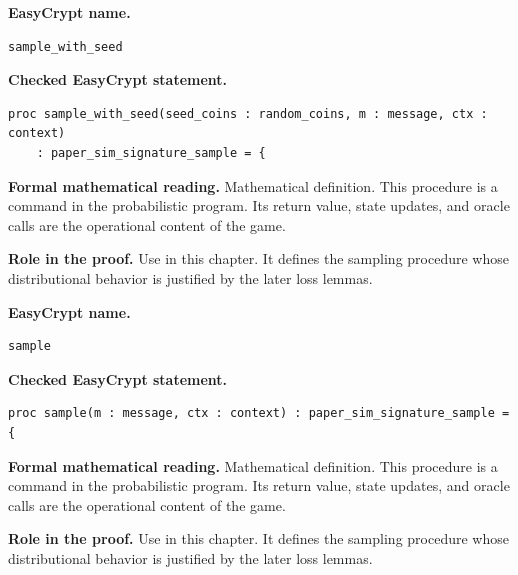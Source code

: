 \begin{formaldefinition}
\noindent\textbf{EasyCrypt name.}
\begin{lstlisting}[language=EasyCrypt,basicstyle=\ttfamily\scriptsize]
sample_with_seed
\end{lstlisting}
\noindent\textbf{Checked EasyCrypt statement.}
\begin{lstlisting}[language=EasyCrypt,basicstyle=\ttfamily\scriptsize]
proc sample_with_seed(seed_coins : random_coins, m : message, ctx : context)
    : paper_sim_signature_sample = {
\end{lstlisting}
\noindent\textbf{Formal mathematical reading.}
Mathematical definition. This procedure is a command in the probabilistic program.  Its return value, state updates, and oracle calls are the operational content of the game.

\noindent\textbf{Role in the proof.}
Use in this chapter. It defines the sampling procedure whose distributional behavior is justified by the later loss lemmas.

\end{formaldefinition}

\begin{formaldefinition}
\noindent\textbf{EasyCrypt name.}
\begin{lstlisting}[language=EasyCrypt,basicstyle=\ttfamily\scriptsize]
sample
\end{lstlisting}
\noindent\textbf{Checked EasyCrypt statement.}
\begin{lstlisting}[language=EasyCrypt,basicstyle=\ttfamily\scriptsize]
proc sample(m : message, ctx : context) : paper_sim_signature_sample = {
\end{lstlisting}
\noindent\textbf{Formal mathematical reading.}
Mathematical definition. This procedure is a command in the probabilistic program.  Its return value, state updates, and oracle calls are the operational content of the game.

\noindent\textbf{Role in the proof.}
Use in this chapter. It defines the sampling procedure whose distributional behavior is justified by the later loss lemmas.

\end{formaldefinition}

